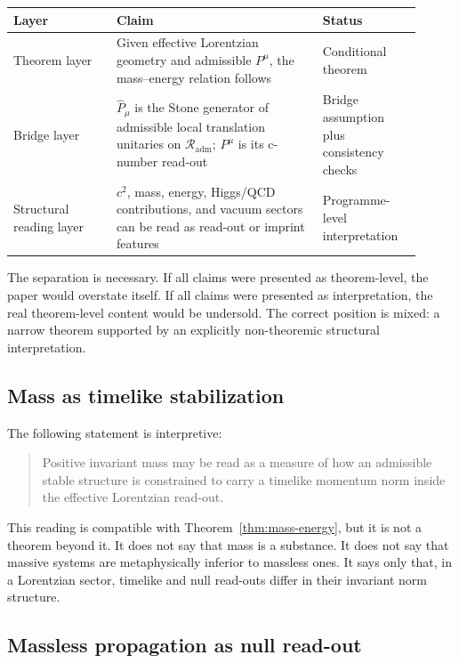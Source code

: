 \documentclass[12pt,a4paper]{article}
\theoremstyle{definition}
\theoremstyle{remark}
\newcommand{\Rout}{\mathcal{R}_{\mathrm{adm}}}
\begin{document}
\begin{center}
\begin{tabular}{P{0.23\linewidth}P{0.46\linewidth}P{0.22\linewidth}}
\toprule
\textbf{Layer} & \textbf{Claim} & \textbf{Status} \\
\midrule
Theorem layer & Given effective Lorentzian geometry and admissible $P^\mu$, the mass--energy relation follows & Conditional theorem \\
Bridge layer & $\hat P_\mu$ is the Stone generator of admissible local translation unitaries on $\Rout$; $P^\mu$ is its c-number read-out & Bridge assumption plus consistency checks \\
Structural reading layer & $c^2$, mass, energy, Higgs/QCD contributions, and vacuum sectors can be read as read-out or imprint features & Programme-level interpretation \\
\bottomrule
\end{tabular}
\end{center}

The separation is necessary. If all claims were presented as theorem-level, the paper would overstate itself. If all claims were presented as interpretation, the real theorem-level content would be undersold. The correct position is mixed: a narrow theorem supported by an explicitly non-theoremic structural interpretation.

\subsection{Mass as timelike stabilization}

The following statement is interpretive:

\begin{quote}
Positive invariant mass may be read as a measure of how an admissible stable structure is constrained to carry a timelike momentum norm inside the effective Lorentzian read-out.
\end{quote}

This reading is compatible with Theorem~\ref{thm:mass-energy}, but it is not a theorem beyond it. It does not say that mass is a substance. It does not say that massive systems are metaphysically inferior to massless ones. It says only that, in a Lorentzian sector, timelike and null read-outs differ in their invariant norm structure.

\subsection{Massless propagation as null read-out}
\end{document}
